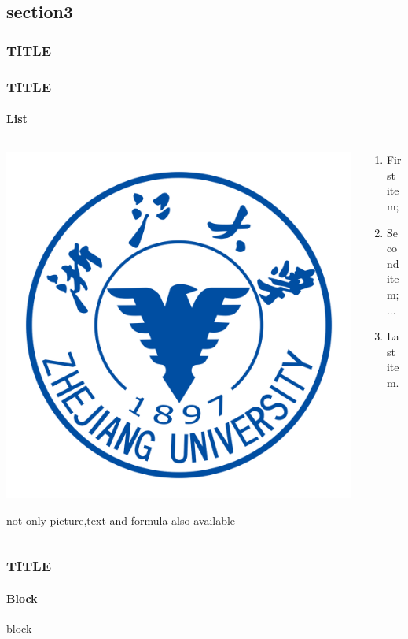 \documentclass[xcolor=svgnames]{beamer}
\begin{document}
\subsection{section3}
\begin{frame}[fragile]
  \frametitle{TITLE}

\end{frame}

\begin{frame}[fragile]
  \frametitle{TITLE}\framesubtitle{List}
  \begin{columns}[T]
    \begin{column}{2in}
\includegraphics[width=0.5\linewidth]{ZJU_LOGO.png}\par
not only picture,text and formula also available
    \end{column}

    \begin{column}{2in}
    \begin{enumerate}
       \item<2-> First item;
       \item<3-> Second item;\\
       ...
       \item<4-> Last item.
     \end{enumerate}
    \end{column}
  \end{columns}
\end{frame}


\begin{frame}[fragile]
  \frametitle{TITLE}\framesubtitle{Block}
  \begin{block}{}
    block
  \end{block}

\end{frame}
\end{document}
